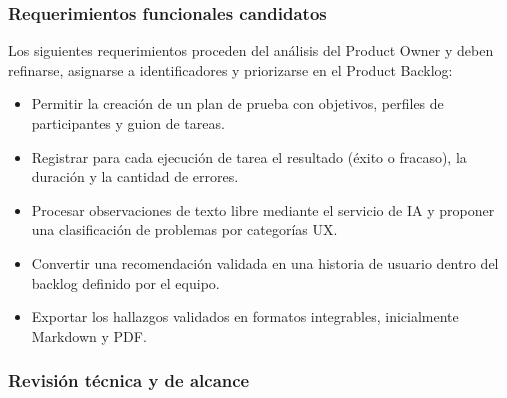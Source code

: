 \documentclass[12pt,a4paper]{article}
\begin{document}
\subsubsection{Requerimientos funcionales candidatos}

Los siguientes requerimientos proceden del análisis del Product Owner y deben
refinarse, asignarse a identificadores y priorizarse en el Product Backlog:

\begin{itemize}
    \item Permitir la creación de un plan de prueba con objetivos, perfiles de participantes y guion de tareas.
    \item Registrar para cada ejecución de tarea el resultado (éxito o fracaso), la duración y la cantidad de errores.
    \item Procesar observaciones de texto libre mediante el servicio de IA y proponer una clasificación de problemas por categorías UX.
    \item Convertir una recomendación validada en una historia de usuario dentro del backlog definido por el equipo.
    \item Exportar los hallazgos validados en formatos integrables, inicialmente Markdown y PDF.
\end{itemize}

\subsubsection{Revisión técnica y de alcance}
\end{document}
